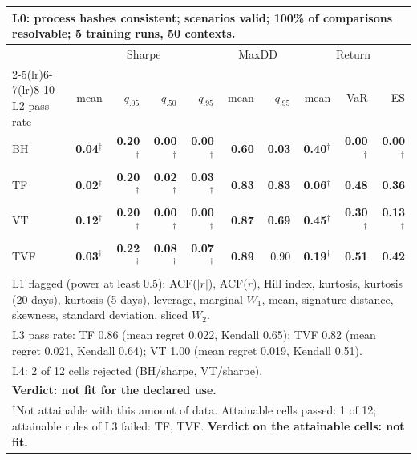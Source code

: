 \begin{tabular}{lrrrrrrrrr}
\toprule
\multicolumn{10}{p{13.5cm}}{L0: process hashes consistent; scenarios valid; 100\% of comparisons resolvable; 5 training runs, 50 contexts.} \\
\midrule
 & \multicolumn{4}{c}{Sharpe} & \multicolumn{2}{c}{MaxDD} & \multicolumn{3}{c}{Return} \\
\cmidrule(lr){2-5}\cmidrule(lr){6-7}\cmidrule(lr){8-10}
L2 pass rate & mean & $q_{.05}$ & $q_{.50}$ & $q_{.95}$ & mean & $q_{.95}$ & mean & VaR & ES \\
\midrule
BH & \textbf{0.04}$^{\dagger}$ & \textbf{0.20}$^{\dagger}$ & \textbf{0.00}$^{\dagger}$ & \textbf{0.00}$^{\dagger}$ & \textbf{0.60} & \textbf{0.03} & \textbf{0.40}$^{\dagger}$ & \textbf{0.00}$^{\dagger}$ & \textbf{0.00}$^{\dagger}$ \\
TF & \textbf{0.02}$^{\dagger}$ & \textbf{0.20}$^{\dagger}$ & \textbf{0.02}$^{\dagger}$ & \textbf{0.03}$^{\dagger}$ & \textbf{0.83} & \textbf{0.83} & \textbf{0.06}$^{\dagger}$ & \textbf{0.48} & \textbf{0.36} \\
VT & \textbf{0.12}$^{\dagger}$ & \textbf{0.20}$^{\dagger}$ & \textbf{0.00}$^{\dagger}$ & \textbf{0.00}$^{\dagger}$ & \textbf{0.87} & \textbf{0.69} & \textbf{0.45}$^{\dagger}$ & \textbf{0.30}$^{\dagger}$ & \textbf{0.13}$^{\dagger}$ \\
TVF & \textbf{0.03}$^{\dagger}$ & \textbf{0.22}$^{\dagger}$ & \textbf{0.08}$^{\dagger}$ & \textbf{0.07}$^{\dagger}$ & \textbf{0.89} & 0.90 & \textbf{0.19}$^{\dagger}$ & \textbf{0.51} & \textbf{0.42} \\
\midrule
\multicolumn{10}{p{13.5cm}}{L1 flagged (power at least 0.5): ACF($|r|$), ACF($r$), Hill index, kurtosis, kurtosis (20 days), kurtosis (5 days), leverage, marginal $W_1$, mean, signature distance, skewness, standard deviation, sliced $W_2$.} \\
\multicolumn{10}{p{13.5cm}}{L3 pass rate: TF 0.86 (mean regret 0.022, Kendall 0.65); TVF 0.82 (mean regret 0.021, Kendall 0.64); VT 1.00 (mean regret 0.019, Kendall 0.51).} \\
\multicolumn{10}{p{13.5cm}}{L4: 2 of 12 cells rejected (BH/sharpe, VT/sharpe).} \\
\multicolumn{10}{p{13.5cm}}{\textbf{Verdict: not fit for the declared use.}} \\
\multicolumn{10}{p{13.5cm}}{$^{\dagger}$Not attainable with this amount of data. Attainable cells passed: 1 of 12; attainable rules of L3 failed: TF, TVF. \textbf{Verdict on the attainable cells: not fit.}} \\
\bottomrule
\end{tabular}

